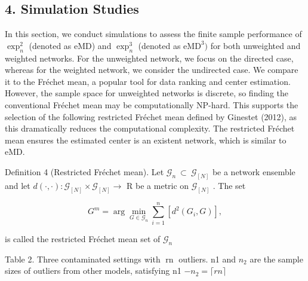 \documentclass[
  10
]{article}
\begin{document}
\subsection{4. Simulation Studies}\label{simulation-studies}

In this section, we conduct simulations to assess the finite sample
performance of \(\exp _ { n } ^ { 2 }\) (denoted as eMD) and
\(\exp _ { n } ^ { 3 }\) (denoted as \(\mathrm { e M D } ^ { 3 } )\) for
both unweighted and weighted networks. For the unweighted network, we
focus on the directed case, whereas for the weighted network, we
consider the undirected case. We compare it to the Fréchet mean, a
popular tool for data ranking and center estimation. However, the sample
space for unweighted networks is discrete, so finding the conventional
Fréchet mean may be computationally NP-hard. This supports the selection
of the following restricted Fréchet mean defined by Ginestet (2012), as
this dramatically reduces the computational complexity. The restricted
Fréchet mean ensures the estimated center is an existent network, which
is similar to eMD.

Definition 4 (Restricted Fréchet mean). Let
\(\mathcal { G } _ { n } ~ \subset ~ \mathcal { G } _ { [ N ] }\) be a
network ensemble and let
\(d ( \cdot , \cdot ) : \mathcal { G } _ { [ N ] } \times \mathcal { G } _ { [ N ] } \to\)
R be a metric on \(\mathcal { G } _ { [ N ] }\) . The set

\[
G ^ {m} = \arg \min _ {G \in \mathcal {G} _ {n}} \sum_ {i = 1} ^ {n} \left[ d ^ {2} (G _ {i}, G) \right],\tag{11}
\]

is called the restricted Fréchet mean set of
\({ \mathcal { G } } _ { n }\)

Table 2. Three contaminated settings with rn outliers. n1 and
\(n _ { 2 }\) are the sample sizes of outliers from other models,
satisfying n1 \(- n _ { 2 } = \lceil r n \rceil\)
\end{document}
